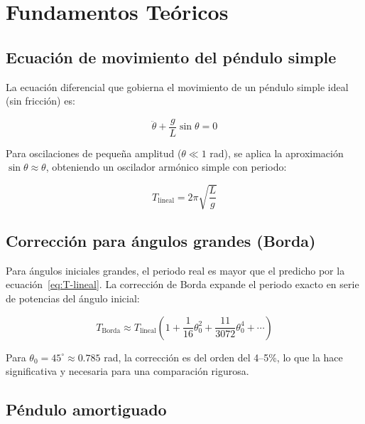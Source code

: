 \documentclass[12pt,a4paper]{article}
\begin{document}
\section{Fundamentos Teóricos}

\subsection{Ecuación de movimiento del péndulo simple}

La ecuación diferencial que gobierna el movimiento de un péndulo simple ideal (sin fricción) es:

\begin{equation}
    \ddot{\theta} + \frac{g}{L}\sin\theta = 0
\end{equation}

Para oscilaciones de pequeña amplitud ($\theta \ll 1$ rad), se aplica la aproximación $\sin\theta \approx \theta$, obteniendo un oscilador armónico simple con periodo:

\begin{equation}
    \label{eq:T-lineal}
    T_{\text{lineal}} = 2\pi\sqrt{\frac{L}{g}}
\end{equation}

\subsection{Corrección para ángulos grandes (Borda)}

Para ángulos iniciales grandes, el periodo real es mayor que el predicho por la ecuación~\eqref{eq:T-lineal}. La corrección de Borda expande el periodo exacto en serie de potencias del ángulo inicial:

\begin{equation}
    \label{eq:T-borda}
    T_{\text{Borda}} \approx T_{\text{lineal}} \left(1 + \frac{1}{16}\theta_0^2 + \frac{11}{3072}\theta_0^4 + \cdots\right)
\end{equation}

Para $\theta_0 = 45^{\circ} \approx 0.785$ rad, la corrección es del orden del 4--5\%, lo que la hace significativa y necesaria para una comparación rigurosa.

\subsection{Péndulo amortiguado}
\end{document}
